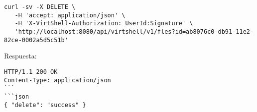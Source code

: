 \begin{lstlisting}[style=json]
curl -sv -X DELETE \
   -H 'accept: application/json' \
   -H 'X-VirtShell-Authorization: UserId:Signature' \
   'http://localhost:8080/api/virtshell/v1/fles?id=ab8076c0-db91-11e2-82ce-0002a5d5c51b'
\end{lstlisting}

\vspace{1cm}
Respuesta:
\vspace{1cm}

\begin{lstlisting}[style=json]
HTTP/1.1 200 OK
Content-Type: application/json
```
```json
{ "delete": "success" }
\end{lstlisting}
